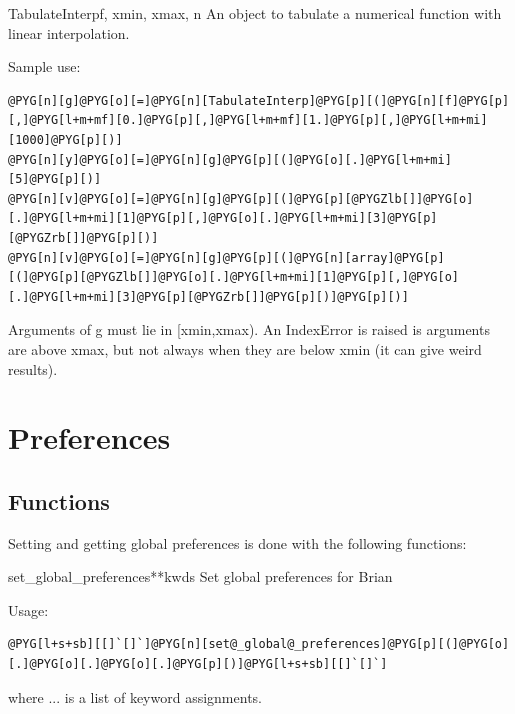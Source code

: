 \documentclass[letterpaper,10pt,english]{manual}
\begin{document}
\hypertarget{brian.TabulateInterp}{}\begin{classdesc}{TabulateInterp}{f, xmin, xmax, n}
An object to tabulate a numerical function with linear interpolation.

Sample use:

\begin{Verbatim}[commandchars=@\[\]]
@PYG[n][g]@PYG[o][=]@PYG[n][TabulateInterp]@PYG[p][(]@PYG[n][f]@PYG[p][,]@PYG[l+m+mf][0.]@PYG[p][,]@PYG[l+m+mf][1.]@PYG[p][,]@PYG[l+m+mi][1000]@PYG[p][)]
@PYG[n][y]@PYG[o][=]@PYG[n][g]@PYG[p][(]@PYG[o][.]@PYG[l+m+mi][5]@PYG[p][)]
@PYG[n][v]@PYG[o][=]@PYG[n][g]@PYG[p][(]@PYG[p][@PYGZlb[]]@PYG[o][.]@PYG[l+m+mi][1]@PYG[p][,]@PYG[o][.]@PYG[l+m+mi][3]@PYG[p][@PYGZrb[]]@PYG[p][)]
@PYG[n][v]@PYG[o][=]@PYG[n][g]@PYG[p][(]@PYG[n][array]@PYG[p][(]@PYG[p][@PYGZlb[]]@PYG[o][.]@PYG[l+m+mi][1]@PYG[p][,]@PYG[o][.]@PYG[l+m+mi][3]@PYG[p][@PYGZrb[]]@PYG[p][)]@PYG[p][)]
\end{Verbatim}

Arguments of g must lie in {[}xmin,xmax).
An IndexError is raised is arguments are above xmax, but
not always when they are below xmin (it can give weird results).
\end{classdesc}

\resetcurrentobjects
\hypertarget{--doc-reference-preferences}{}

\hypertarget{preferences}{}\section{Preferences}


\subsection{Functions}

Setting and getting global preferences is done with the following
functions:

\hypertarget{brian.set_global_preferences}{}\begin{funcdesc}{set\_global\_preferences}{**kwds}
Set global preferences for Brian

Usage:

\begin{Verbatim}[commandchars=@\[\]]
@PYG[l+s+sb][[]`[]`]@PYG[n][set@_global@_preferences]@PYG[p][(]@PYG[o][.]@PYG[o][.]@PYG[o][.]@PYG[p][)]@PYG[l+s+sb][[]`[]`]
\end{Verbatim}

where ... is a list of keyword assignments.
\end{funcdesc}
\end{document}
